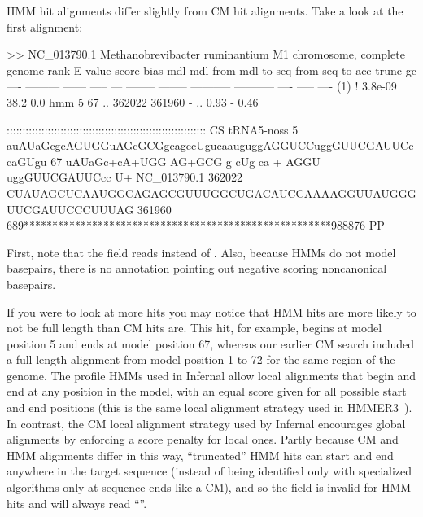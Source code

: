 HMM hit alignments differ slightly from CM hit alignments. Take a look
at the first alignment:

\newpage

\begin{sreoutput}
>> NC_013790.1  Methanobrevibacter ruminantium M1 chromosome, complete genome
 rank     E-value  score  bias mdl mdl from   mdl to       seq from      seq to       acc trunc   gc
 ----   --------- ------ ----- --- -------- --------    ----------- -----------      ---- ----- ----
  (1) !   3.8e-09   38.2   0.0 hmm        5       67 ..      362022      361960 - .. 0.93     - 0.46

                     ::::::::::::::::::::::::::::::::::::::::::::::::::::::::::::::: CS
   tRNA5-noss      5 auAUaGcgcAGUGGuAGcGCGgcagccUgucaauguggAGGUCCuggGUUCGAUUCccaGUgu 67    
                      uAUaGc+cA+UGG AG+GCG   g cUg ca  +   AGGU  uggGUUCGAUUCcc  U+ 
  NC_013790.1 362022 CUAUAGCUCAAUGGCAGAGCGUUUGGCUGACAUCCAAAAGGUUAUGGGUUCGAUUCCCUUUAG 361960
                     689******************************************************988876 PP
\end{sreoutput}

First, note that the  field reads  instead of
. Also, because HMMs do not model basepairs, there is no
 annotation pointing out negative scoring noncanonical
basepairs.

If you were to look at more hits you may notice that HMM hits are
more likely to not be full length than CM hits are. This hit, for
example, begins at model position 5 and ends at model position 67,
whereas our earlier CM search included a full length alignment from
model position 1 to 72 for the same region of the genome. The profile
HMMs used in Infernal allow local alignments that begin and end at any
position in the model, with an equal score given for all possible
start and end positions (this is the same local alignment strategy
used in HMMER3~\citep{Eddy08}). In contrast, the CM local alignment
strategy used by Infernal encourages global alignments by enforcing a
score penalty for local ones. Partly because CM and HMM alignments
differ in this way, ``truncated'' HMM hits can start and end anywhere
in the target sequence (instead of being identified only with
specialized algorithms only at sequence ends like a CM), and so the
 field is invalid for HMM hits and will always read
``\otext{-}''.

